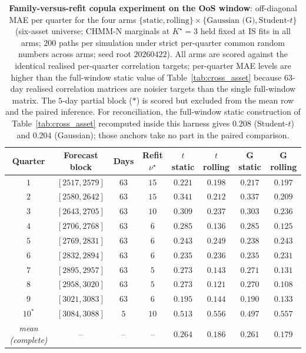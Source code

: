 \begin{table}[!ht]
\centering
\small
\setlength{\tabcolsep}{4pt}
\caption{\textbf{Family-versus-refit copula experiment on the OoS window}: off-diagonal MAE per quarter for the four arms $\{\text{static}, \text{rolling}\} \times \{\text{Gaussian (G)}, \text{Student-}t\}$ (six-asset universe; CHMM-N marginals at $K^\star = 3$ held fixed at IS fits in all arms; $200$ paths per simulation under strict per-quarter common random numbers across arms; seed root $20260422$). All arms are scored against the identical realised per-quarter correlation targets; per-quarter MAE levels are higher than the full-window static value of Table~\ref{tab:cross_asset} because $63$-day realised correlation matrices are noisier targets than the single full-window matrix. The $5$-day partial block ($\ast$) is scored but excluded from the mean row and the paired inference. For reconciliation, the full-window static construction of Table~\ref{tab:cross_asset} recomputed inside this harness gives $0.208$ (Student-$t$) and $0.204$ (Gaussian); those anchors take no part in the paired comparison.}
\label{tab:rolling_copula}
\begin{tabular}{c c c c c c c c}
\toprule
Quarter & Forecast block & Days & Refit $\nu^\star$ & $t$ static & $t$ rolling & G static & G rolling \\
\midrule
$1$  & $[2517, 2579]$ & $63$ & $15$ & $0.221$ & $0.198$ & $0.217$ & $0.197$ \\
$2$  & $[2580, 2642]$ & $63$ & $15$ & $0.341$ & $0.212$ & $0.337$ & $0.209$ \\
$3$  & $[2643, 2705]$ & $63$ & $10$ & $0.309$ & $0.237$ & $0.303$ & $0.236$ \\
$4$  & $[2706, 2768]$ & $63$ & $6$  & $0.285$ & $0.136$ & $0.285$ & $0.125$ \\
$5$  & $[2769, 2831]$ & $63$ & $6$  & $0.243$ & $0.249$ & $0.238$ & $0.243$ \\
$6$  & $[2832, 2894]$ & $63$ & $6$  & $0.235$ & $0.236$ & $0.235$ & $0.231$ \\
$7$  & $[2895, 2957]$ & $63$ & $5$  & $0.273$ & $0.143$ & $0.271$ & $0.131$ \\
$8$  & $[2958, 3020]$ & $63$ & $5$  & $0.273$ & $0.121$ & $0.270$ & $0.108$ \\
$9$  & $[3021, 3083]$ & $63$ & $6$  & $0.195$ & $0.144$ & $0.190$ & $0.133$ \\
$10^\ast$ & $[3084, 3088]$ & $5$ & $10$ & $0.513$ & $0.556$ & $0.497$ & $0.557$ \\
\midrule
\textit{mean (complete)} & -- & -- & -- & $0.264$ & $0.186$ & $0.261$ & $0.179$ \\
\bottomrule
\end{tabular}
\end{table}

